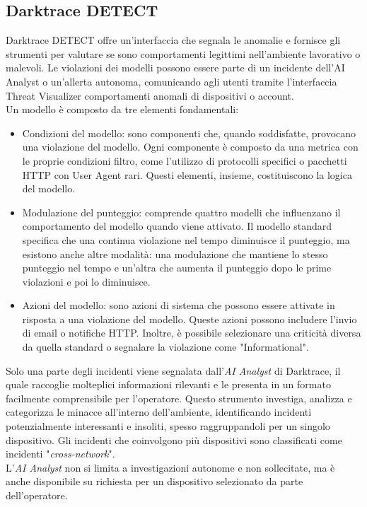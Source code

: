 \documentclass[12pt,a4paper,oneside,onecolumn,openright]{book}
\begin{document}
	\subsection{Darktrace DETECT}
	Darktrace DETECT offre un'interfaccia che segnala le anomalie e fornisce gli strumenti per valutare se sono comportamenti legittimi nell'ambiente lavorativo o malevoli. Le violazioni dei modelli possono essere parte di un incidente dell'AI Analyst o un'allerta autonoma, comunicando agli utenti tramite l'interfaccia Threat Visualizer comportamenti anomali di dispositivi o account.\cite{threat2}\\
	Un modello è composto da tre elementi fondamentali:
	\begin{itemize}
		\item Condizioni del modello: sono componenti che, quando soddisfatte, provocano una violazione del modello. Ogni componente è composto da una metrica con le proprie condizioni filtro, come l'utilizzo di protocolli specifici o pacchetti HTTP con User Agent rari. Questi elementi, insieme, costituiscono la logica del modello.
		\item Modulazione del punteggio: comprende quattro modelli che influenzano il comportamento del modello quando viene attivato. Il modello standard specifica che una continua violazione nel tempo diminuisce il punteggio, ma esistono anche altre modalità: una modulazione che mantiene lo stesso punteggio nel tempo e un'altra che aumenta il punteggio dopo le prime violazioni e poi lo diminuisce.
		\item Azioni del modello: sono azioni di sistema che possono essere attivate in risposta a una violazione del modello. Queste azioni possono includere l'invio di email o notifiche HTTP. Inoltre, è possibile selezionare una criticità diversa da quella standard o segnalare la violazione come "Informational".\cite{model}
	\end{itemize}
	Solo una parte degli incidenti viene segnalata dall'\textit{AI Analyst} di Darktrace, il quale raccoglie molteplici informazioni rilevanti e le presenta in un formato facilmente comprensibile per l'operatore. Questo strumento investiga, analizza e categorizza le minacce all'interno dell'ambiente, identificando incidenti potenzialmente interessanti e insoliti, spesso raggruppandoli per un singolo dispositivo. Gli incidenti che coinvolgono più dispositivi sono classificati come incidenti "\textit{cross-network}".\\
	L'\textit{AI Analyst} non si limita a investigazioni autonome e non sollecitate, ma è anche disponibile su richiesta per un dispositivo selezionato da parte dell'operatore.\\
\end{document}
